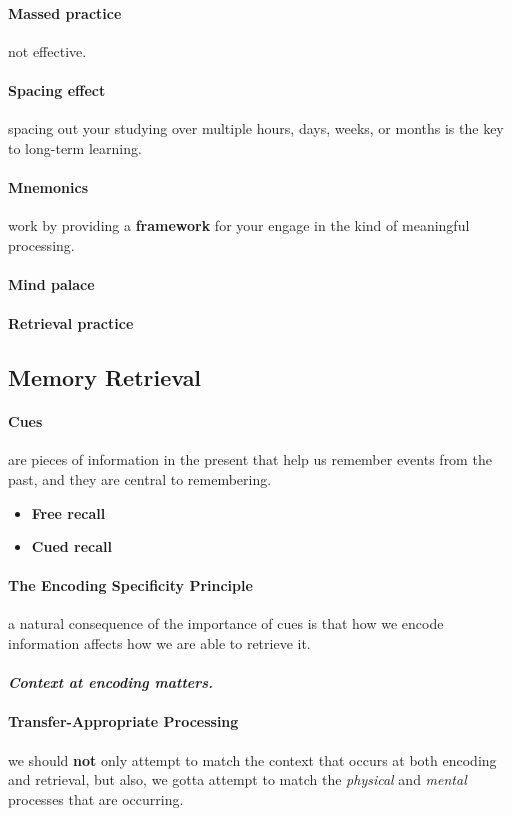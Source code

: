 \documentclass{article}
\begin{document}
	\paragraph{Massed practice} not effective.
	\paragraph{Spacing effect} spacing out your studying over multiple hours, days, weeks, or months is the key to long-term learning.
	\paragraph{Mnemonics} work by providing a \textbf{framework} for your engage in the kind of meaningful processing.
	\paragraph{Mind palace}
	\paragraph{Retrieval practice}
	\subsection{Memory Retrieval}
	\paragraph{Cues} are pieces of information in the present that help us remember events from the past, and they are central to remembering.
	\begin{itemize}
		\item \textbf{Free recall}
		\item \textbf{Cued recall}
	\end{itemize}
	\paragraph{The Encoding Specificity Principle} a natural consequence of the importance of cues is that how we encode information affects how we are able to retrieve it.
	\paragraph{}\emph{\textbf{Context at encoding matters.}}
	\paragraph{Transfer-Appropriate Processing} we should \textbf{not} only attempt to match the context that occurs at both encoding and retrieval, but also, we gotta attempt to match the \emph{physical} and \emph{mental} processes that are occurring.
\end{document}
